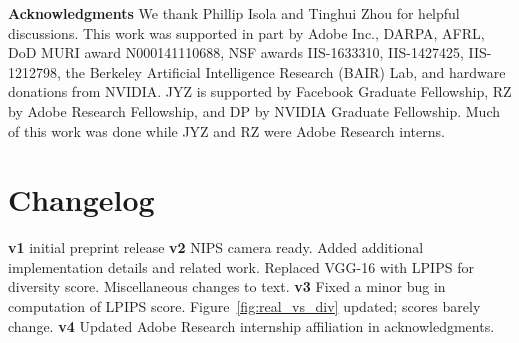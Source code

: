 {\bf Acknowledgments}
\small We thank Phillip Isola and Tinghui Zhou for helpful discussions. This work was supported in part by Adobe Inc., DARPA, AFRL, DoD MURI award N000141110688, NSF awards IIS-1633310, IIS-1427425, IIS-1212798, the Berkeley Artificial Intelligence Research (BAIR) Lab, and hardware donations from NVIDIA. JYZ is supported by Facebook Graduate Fellowship, RZ by Adobe Research Fellowship, and DP by NVIDIA Graduate Fellowship. Much of this work was done while JYZ and RZ were Adobe Research interns.

\section*{Changelog}
\small

\textbf{v1} initial preprint release
\textbf{v2} NIPS camera ready. Added additional implementation details and related work. Replaced VGG-16 with LPIPS for diversity score. Miscellaneous changes to text.
\textbf{v3} Fixed a minor bug in computation of LPIPS score. Figure~\ref{fig:real_vs_div} updated; scores barely change.
\textbf{v4} Updated Adobe Research internship affiliation in acknowledgments.


